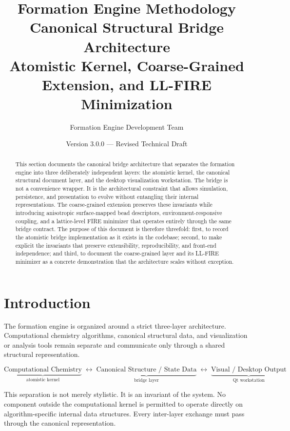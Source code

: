 ﻿\documentclass[11pt]{article}
\title{\textbf{Formation Engine Methodology}\\
\Large Canonical Structural Bridge Architecture\\[4pt]
\large Atomistic Kernel, Coarse-Grained Extension, and LL-FIRE Minimization}
\author{Formation Engine Development Team}
\date{Version 3.0.0 --- Revised Technical Draft}
\begin{document}
\maketitle
\begin{abstract}
This section documents the canonical bridge architecture that separates the
formation engine into three deliberately independent layers: the atomistic
kernel, the canonical structural document layer, and the desktop visualization
workstation. The bridge is not a convenience wrapper. It is the architectural
constraint that allows simulation, persistence, and presentation to evolve
without entangling their internal representations. The coarse-grained
extension preserves these invariants while introducing anisotropic
surface-mapped bead descriptors, environment-responsive coupling, and a
lattice-level FIRE minimizer that operates entirely through the same bridge
contract. The purpose of this document is therefore threefold: first, to
record the atomistic bridge implementation as it exists in the codebase;
second, to make explicit the invariants that preserve extensibility,
reproducibility, and front-end independence; and third, to document the
coarse-grained layer and its LL-FIRE minimizer as a concrete demonstration
that the architecture scales without exception.
\end{abstract}

\tableofcontents
\newpage

\section{Introduction}

The formation engine is organized around a strict three-layer architecture.
Computational chemistry algorithms, canonical structural data, and
visualization or analysis tools remain separate and communicate only through a
shared structural representation.

\[
  \underbrace{\text{Computational Chemistry}}_{\text{atomistic kernel}}
  \;\longleftrightarrow\;
  \underbrace{\text{Canonical Structure / State Data}}_{\text{bridge layer}}
  \;\longleftrightarrow\;
  \underbrace{\text{Visual / Desktop Output}}_{\text{Qt workstation}}
\]

This separation is not merely stylistic. It is an invariant of the system. No
component outside the computational kernel is permitted to operate directly on
algorithm-specific internal data structures. Every inter-layer exchange must
pass through the canonical representation.
\end{document}
